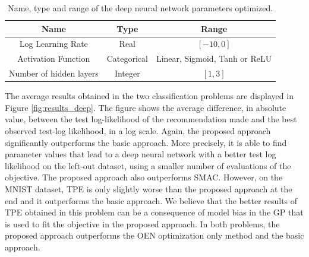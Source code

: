 \begin{table}[htb]
\centering
\caption{Name, type and range of the deep neural network parameters optimized.}
\begin{tabular}{ c | c | c }
 \hline
 {\bf Name} & {\bf Type} & {\bf Range} \\
 \hline
 Log Learning Rate & Real & $[-10,0]$ \\
 Activation Function & Categorical & Linear, Sigmoid, Tanh or ReLU \\
 Number of hidden layers & Integer & $[1,3]$ \\
 \hline
\end{tabular}
\label{table:2}
\end{table}

The average results obtained in the two classification problems are displayed in Figure \ref{fig:results_deep}.
The figure shows the average difference, in absolute value, between the test log-likelihood
of the recommendation made and the best observed test-log likelihood, in a log scale.
Again, the proposed approach significantly outperforms the basic approach. More precisely, it is able
to find parameter values that lead to a deep neural network with a better test log likelihood
on the left-out dataset, using a smaller number of evaluations of the objective. The proposed approach
also outperforms SMAC. However, on the MNIST dataset, TPE is only slightly worse than the proposed approach at
the end and it outperforms the basic approach. We believe that the better results of TPE obtained in this
problem can be a consequence of model bias in the GP that is used to fit the objective in the
proposed approach. In both problems, the proposed approach outperforms the OEN optimization only method and the basic approach.

